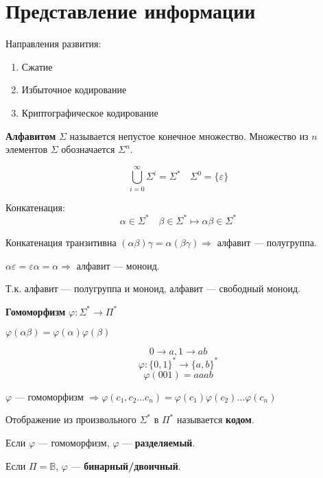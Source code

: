 

\cfoot{}



\section{Представление информации}

Направления развития:
\begin{enumerate}
    \item Сжатие
    \item Избыточное кодирование
    \item Криптографическое кодирование
\end{enumerate}

\begin{definition}
    \textbf{Алфавитом} $\Sigma$ называется непустое конечное множество. Множество из $n$ элементов $\Sigma$ обозначается $\Sigma^n$.
\end{definition}

$$\bigcup\limits_{i=0}^\infty \Sigma^i=\Sigma^* \quad \Sigma^0=\{\varepsilon\}$$

\begin{definition}
    Конкатенация:
    $$\alpha\in\Sigma^* \quad \beta\in\Sigma^* \mapsto \alpha\beta\in\Sigma^*$$
\end{definition}

Конкатенация транзитивна $(\alpha\beta)\gamma=\alpha(\beta\gamma) \Rightarrow$ алфавит --- полугруппа.

$\alpha\varepsilon=\varepsilon\alpha=\alpha \Rightarrow$ алфавит --- моноид.

Т.к. алфавит --- полугруппа и моноид, алфавит --- свободный моноид.

\begin{definition}
    \textbf{Гомоморфизм} $\varphi: \Sigma^*\to \Pi^*$

    $\varphi(\alpha\beta)=\varphi(\alpha)\varphi(\beta)$
\end{definition}

\begin{example}
    $$0\to a, 1\to ab$$
    $$\varphi: \{0,1\}^*\to\{a,b\}^*$$
    $$\varphi(001)=aaab$$
\end{example}

$\varphi$ --- гомоморфизм $\Rightarrow \varphi(c_1,c_2\ldots c_n)=\varphi(c_1)\varphi(c_2)\ldots\varphi(c_n)$

\begin{definition}
    Отображение из произвольного $\Sigma^*$ в $\Pi^*$ называется \textbf{кодом}.

    Если $\varphi$ --- гомоморфизм, $\varphi$ --- \textbf{разделяемый}.

    Если $\Pi=\mathbb{B}$, $\varphi$ --- \textbf{бинарный/двоичный}.
\end{definition}

